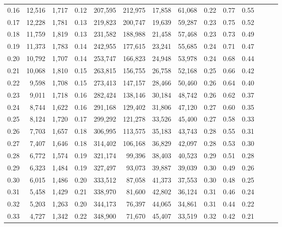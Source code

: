 \begin{tabular}{rrrrrrrrrrrrrr}
0.16 &  12,516 &  1,717 &  0.12 &  207,595 &  212,975 &  17,858 &  61,068 &  0.22 &  0.77 &      0.55 \\
0.17 &  12,228 &  1,781 &  0.13 &  219,823 &  200,747 &  19,639 &  59,287 &  0.23 &  0.75 &      0.52 \\
0.18 &  11,759 &  1,819 &  0.13 &  231,582 &  188,988 &  21,458 &  57,468 &  0.23 &  0.73 &      0.49 \\
0.19 &  11,373 &  1,783 &  0.14 &  242,955 &  177,615 &  23,241 &  55,685 &  0.24 &  0.71 &      0.47 \\
0.20 &  10,792 &  1,707 &  0.14 &  253,747 &  166,823 &  24,948 &  53,978 &  0.24 &  0.68 &      0.44 \\
0.21 &  10,068 &  1,810 &  0.15 &  263,815 &  156,755 &  26,758 &  52,168 &  0.25 &  0.66 &      0.42 \\
0.22 &   9,598 &  1,708 &  0.15 &  273,413 &  147,157 &  28,466 &  50,460 &  0.26 &  0.64 &      0.40 \\
0.23 &   9,011 &  1,718 &  0.16 &  282,424 &  138,146 &  30,184 &  48,742 &  0.26 &  0.62 &      0.37 \\
0.24 &   8,744 &  1,622 &  0.16 &  291,168 &  129,402 &  31,806 &  47,120 &  0.27 &  0.60 &      0.35 \\
0.25 &   8,124 &  1,720 &  0.17 &  299,292 &  121,278 &  33,526 &  45,400 &  0.27 &  0.58 &      0.33 \\
0.26 &   7,703 &  1,657 &  0.18 &  306,995 &  113,575 &  35,183 &  43,743 &  0.28 &  0.55 &      0.31 \\
0.27 &   7,407 &  1,646 &  0.18 &  314,402 &  106,168 &  36,829 &  42,097 &  0.28 &  0.53 &      0.30 \\
0.28 &   6,772 &  1,574 &  0.19 &  321,174 &   99,396 &  38,403 &  40,523 &  0.29 &  0.51 &      0.28 \\
0.29 &   6,323 &  1,484 &  0.19 &  327,497 &   93,073 &  39,887 &  39,039 &  0.30 &  0.49 &      0.26 \\
0.30 &   6,015 &  1,486 &  0.20 &  333,512 &   87,058 &  41,373 &  37,553 &  0.30 &  0.48 &      0.25 \\
0.31 &   5,458 &  1,429 &  0.21 &  338,970 &   81,600 &  42,802 &  36,124 &  0.31 &  0.46 &      0.24 \\
0.32 &   5,203 &  1,263 &  0.20 &  344,173 &   76,397 &  44,065 &  34,861 &  0.31 &  0.44 &      0.22 \\
0.33 &   4,727 &  1,342 &  0.22 &  348,900 &   71,670 &  45,407 &  33,519 &  0.32 &  0.42 &      0.21 \\

\end{tabular}

